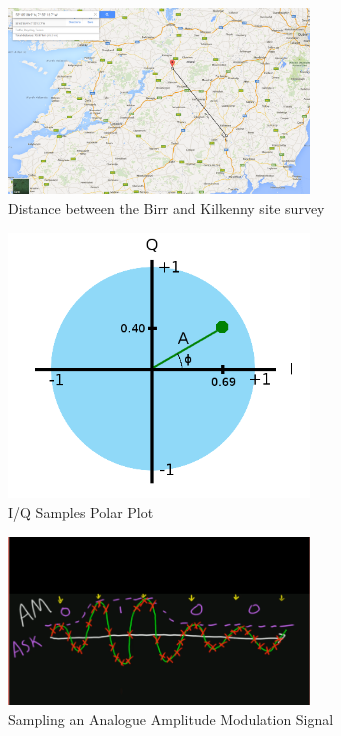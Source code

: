 \documentclass[runningheads,a4paper]{llncs}
\begin{document}
%
\begin{figure}[here]
\centering
\includegraphics[width=8cm]{images/36}
\caption{Distance between the Birr and Kilkenny site survey}
\label{fig:site_survey_birr_kilkenny_distance}
\end{figure}
%

%
\begin{figure}[here]
\centering
\includegraphics[width=8cm]{images/47}
\caption{I/Q Samples Polar Plot \citep{kuisma-14}}
\label{fig:kuisma-iq-polar}
\end{figure}
%

%
\begin{figure}[here]
\centering
\includegraphics[width=8cm]{images/46}
\caption{Sampling an Analogue Amplitude Modulation Signal \citep{ossmann-15-c}}
\label{fig:ossmann_am_demodulation}
\end{figure}
%
\end{document}
